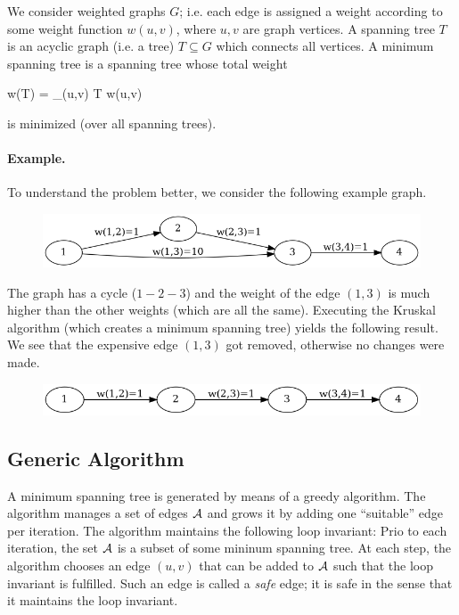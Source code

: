 
We consider weighted graphs $G$; i.e. each edge is assigned a weight according to some weight function $w(u,v)$, where $u,v$ are graph vertices. A spanning tree $T$ is an acyclic graph (i.e. a tree) $T \subseteq G$ which connects all vertices. A minimum spanning tree is a spanning tree whose total weight

\bee
w(T) = \sum_{(u,v) \in T} w(u,v)
\eee

is minimized (over all spanning trees).

\paragraph{Example.} To understand the problem better, we consider the following example graph.

\begin{figure}[H]
\centering
\includegraphics[scale=0.4]{images/mst_1_1.png}
\end{figure}

The graph has a cycle ($1-2-3$) and the weight of the edge $(1,3)$ is much higher than the other weights (which are all the same). Executing the Kruskal algorithm (which creates a minimum spanning tree) yields the following result. We see that the expensive edge $(1,3)$ got removed, otherwise no changes were made.

\begin{figure}[H]
\centering
\includegraphics[scale=0.4]{images/mst_1_2.png}
\end{figure}


\subsection{Generic Algorithm}

A minimum spanning tree is generated by means of a greedy algorithm. The algorithm manages a set of edges $\mathcal{A}$ and grows it by adding one ``suitable'' edge per iteration. The algorithm maintains the following loop invariant: Prio to each iteration, the set $\mathcal{A}$ is a subset of some mininum spanning tree. At each step, the algorithm chooses an edge $(u,v)$ that can be added to $\mathcal{A}$ such that the loop invariant is fulfilled. Such an edge is called a \emph{safe} edge; it is safe in the sense that it maintains the loop invariant.

